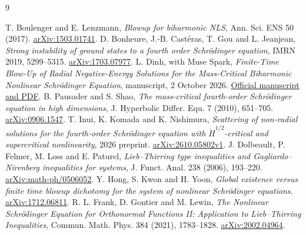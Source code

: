 \documentclass[11pt,a4paper]{article}
\theoremstyle{remark}\newtheorem{remark}[theorem]{Remark}
\begin{document}
\clearpage
\begin{thebibliography}{9}
\raggedright
{} T. Boulenger and E. Lenzmann,
\emph{Blowup for biharmonic NLS}, Ann. Sci. ENS 50 (2017).
\href{https://arxiv.org/abs/1503.01741}{arXiv:1503.01741}.
 D. Bonheure, J.-B. Cast\'eras, T. Gou and L. Jeanjean,
\emph{Strong instability of ground states to a fourth order Schr\"odinger equation},
IMRN 2019, 5299--5315.
\href{https://arxiv.org/abs/1703.07977}{arXiv:1703.07977}.
 L. Dinh, with Muse Spark,
\emph{Finite-Time Blow-Up of Radial Negative-Energy Solutions for the
Mass-Critical Biharmonic Nonlinear Schr\"odinger Equation}, manuscript,
2 October 2026.
\href{https://ai.meta.com/research/publications/finite-time-blow-up-of-radial-negative-energy-solutions-for-the-mass-critical-biharmonic-nonlinear-schrodinger-equation/}{Official manuscript and PDF}.
 B. Pausader and S. Shao,
\emph{The mass-critical fourth-order Schr\"odinger equation in high dimensions},
J. Hyperbolic Differ. Equ. 7 (2010), 651--705.
\href{https://arxiv.org/abs/0906.1547}{arXiv:0906.1547}.
 T. Inui, K. Komada and K. Nishimura,
\emph{Scattering of non-radial solutions for the fourth-order
Schr\"odinger equation with $\dot H^{1/2}$-critical and supercritical nonlinearity},
2026 preprint.
\href{https://arxiv.org/abs/2610.05802}{arXiv:2610.05802v1}.
 J. Dolbeault, P. Felmer, M. Loss and E. Paturel,
\emph{Lieb--Thirring type inequalities and Gagliardo--Nirenberg
inequalities for systems}, J. Funct. Anal. 238 (2006), 193--220.
\href{https://arxiv.org/abs/math-ph/0506052}{arXiv:math-ph/0506052}.
 Y. Hong, S. Kwon and H. Yoon,
\emph{Global existence versus finite time blowup dichotomy for the system
of nonlinear Schr\"odinger equations}.
\href{https://arxiv.org/abs/1712.06811}{arXiv:1712.06811}.
 R. L. Frank, D. Gontier and M. Lewin,
\emph{The Nonlinear Schr\"odinger Equation for Orthonormal Functions II:
Application to Lieb--Thirring Inequalities},
Commun. Math. Phys. 384 (2021), 1783--1828.
\href{https://arxiv.org/abs/2002.04964}{arXiv:2002.04964}.
\end{thebibliography}
\end{document}
